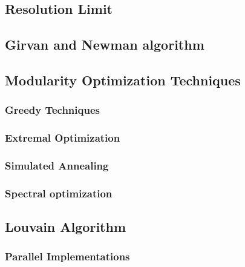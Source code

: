 \subsection{Resolution Limit}
\subsection{Girvan and Newman algorithm}
\subsection{Modularity Optimization Techniques}
\subsubsection{Greedy Techniques}
\subsubsection{Extremal Optimization}
\subsubsection{Simulated Annealing}
\subsubsection{Spectral optimization}
\subsection{Louvain Algorithm}
\subsubsection{Parallel Implementations}
